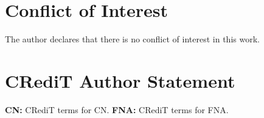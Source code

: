 
\section*{Conflict of Interest}

    The author declares that there is no conflict of interest in this work.



\section*{CRediT Author Statement}

    \textbf{CN:} CRediT terms for CN. \textbf{FNA:} CRediT terms for FNA.


